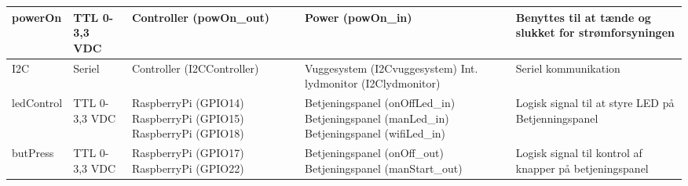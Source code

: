 \begin{center}
\begin{longtable}{|p{}|p{}|p{}|p{}|p{3cm}|}
powerOn			
&TTL 0-3,3 VDC				
&Controller \newline (powOn\_out) 			
&Power \newline (powOn\_in)	
&Benyttes til at tænde og slukket for strømforsyningen   				\\\hline

I2C			
&Seriel				
&Controller \newline (I2CController) 			
&Vuggesystem \newline (I2Cvuggesystem) \newline
 Int. lydmonitor \newline (I2Clydmonitor)	
&Seriel kommunikation
\\\hline

ledControl
&TTL 0-3,3 VDC		
&RaspberryPi \newline (GPIO14) \newline
 RaspberryPi \newline (GPIO15) \newline
 RaspberryPi \newline (GPIO18)
&Betjeningspanel \newline (onOffLed\_in) \newline
 Betjeningspanel \newline (manLed\_in) \newline
 Betjeningspanel \newline (wifiLed\_in)
&Logisk signal til at styre LED på Betjenningspanel
\\\hline

butPress
&TTL 0-3,3 VDC		
&RaspberryPi \newline (GPIO17) \newline
 RaspberryPi \newline (GPIO22)
&Betjeningspanel \newline (onOff\_out) \newline
 Betjeningspanel \newline (manStart\_out)
&Logisk signal til kontrol af knapper på betjeningspanel
\\\hline

\end{longtable}
\end{center}